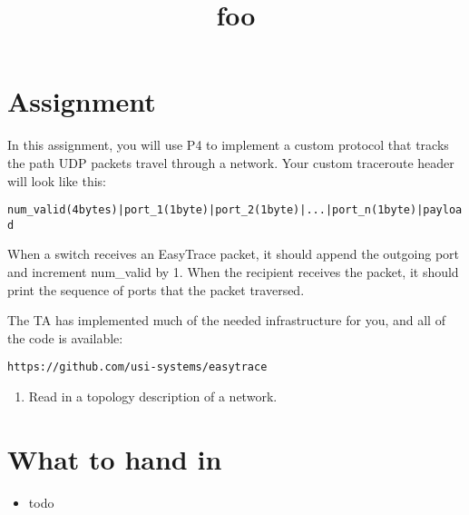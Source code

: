 \documentclass{article}
\title{foo}
\begin{document}




\section*{Assignment}

In this assignment, you will use P4 to implement a custom protocol
that tracks the path UDP packets travel through a network. Your custom
traceroute header will look like this:

\begin{alltt}
 num\_valid (4 bytes) | port\_1 (1 byte) | port\_2 (1 byte) | ... | port\_n (1 byte) | payload
\end{alltt}

\noindent
When a switch receives an EasyTrace packet, it should append the outgoing port and increment num\_valid by 1. When the recipient receives the packet, it should print the sequence of ports that the packet traversed.

The TA has implemented much of the needed infrastructure for you, and all of the code is available:

\begin{alltt}
https://github.com/usi-systems/easytrace
\end{alltt}

\begin{enumerate}
\item Read in a topology description of a network.

\end{enumerate}

\section*{What to hand in}
\begin{itemize}
\item todo
\end{itemize}
\end{document}
